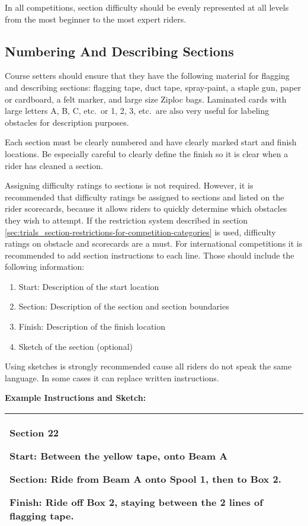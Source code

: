 In all competitions, section difficulty should be evenly represented at all levels from the most beginner to the most expert riders.

\subsection{Numbering And Describing Sections \label{sec:trials_guidelines-for-course-setters}}
Course setters should ensure that they have the following material for flagging and describing sections: flagging tape, duct tape, spray-paint, a staple gun, paper or cardboard, a felt marker, and large size Ziploc bags.
Laminated cards with large letters A, B, C, etc.\ or 1, 2, 3, etc.\ are also very useful for labeling obstacles for description purposes.

Each section must be clearly numbered and have clearly marked start and finish locations.
Be especially careful to clearly define the finish so it is clear when a rider has cleaned a section.

Assigning difficulty ratings to sections is not required.
However, it is recommended that difficulty ratings be assigned to sections and listed on the rider scorecards, because it allows riders to quickly determine which obstacles they wish to attempt.
If the restriction system described in section \ref{sec:trials_section-restrictions-for-competition-categories} is used, difficulty ratings on obstacle and scorecards are a must.
For international competitions it is recommended to add section instructions to each line.
Those should include the following information:

\begin{enumerate}
\item  Start: Description of the start location
\item Section: Description of the section and section boundaries
\item Finish: Description of the finish location
\item Sketch of the section (optional)
\end{enumerate}
Using sketches is strongly recommended cause all riders do not speak the same language.
In some cases it can replace written instructions.

\textbf{Example Instructions and Sketch:}

\begin{tabular}{|p{8cm} r|}
\hline
\vspace{1mm}
\textbf{Section 22}

\textbf{Start:} Between the yellow tape, onto Beam A

\textbf{Section:} Ride from Beam A onto Spool 1, then to Box 2.

\textbf{Finish:} Ride off Box 2, staying between the 2 lines of flagging tape.
\vspace{8mm}
&
\raisebox{-1\height}{\texttt{[image: trials]} }\\
\hline
\end{tabular}

